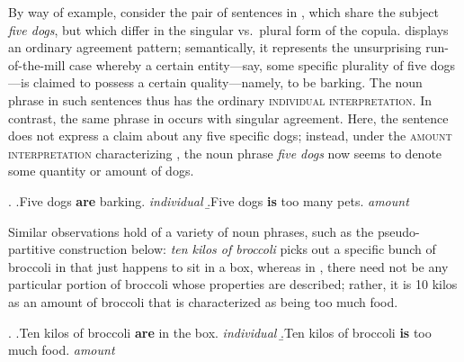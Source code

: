 \documentclass[a4paper,12pt,twoside]{article}
\begin{document}
	By way of example, consider the pair of sentences in \Next, which share the subject \textit{five dogs}, but which differ in the singular vs.\ plural form of the copula. \Next[a]  displays an ordinary agreement pattern; semantically, it  represents the unsurprising run-of-the-mill case whereby a certain entity---say, some  specific plurality of five dogs---is claimed to possess a certain quality---namely, to be barking. The noun phrase in such sentences thus has the  ordinary \textsc{individual interpretation}. In contrast, the same phrase in \Next[b] occurs with singular agreement. Here, the sentence does not express a claim about any five specific dogs; instead, under the \textsc{amount interpretation} characterizing \Next[b], the noun phrase \textit{five dogs} now seems to denote some quantity or amount of dogs.
	
	\ex.\label{dog}
	\a.\label{dog:a}Five dogs \textbf{are} barking. \hfill \textit{individual}
	\b.\label{dog:b}Five dogs \textbf{is} too many pets. \hfill \textit{amount}
	
	Similar observations hold of a variety of noun phrases, such as the pseudo-partitive construction below: \textit{ten kilos of broccoli} picks out a specific bunch of broccoli in \Next[a] that just happens to sit in a box, whereas in \Next[b], there need not be any particular portion of broccoli whose properties are described; rather, it is 10 kilos as an amount of broccoli that is characterized as being too much food.
	
	\ex.\label{broccoli}
	\a.\label{broccoli:a}Ten kilos of broccoli \textbf{are} in the box. \hfill \textit{individual}
	\b.\label{broccoli:b}Ten kilos of broccoli \textbf{is} too much food. \hfill \textit{amount}
	
\end{document}
